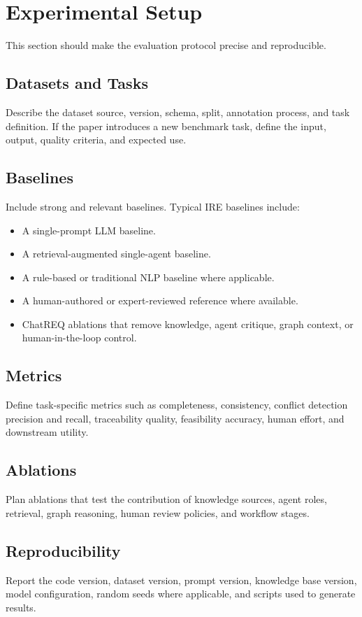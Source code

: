 \section{Experimental Setup}

This section should make the evaluation protocol precise and reproducible.

\subsection{Datasets and Tasks}

Describe the dataset source, version, schema, split, annotation process, and task definition. If the paper introduces a new benchmark task, define the input, output, quality criteria, and expected use.

\subsection{Baselines}

Include strong and relevant baselines. Typical IRE baselines include:

\begin{itemize}
  \item A single-prompt LLM baseline.
  \item A retrieval-augmented single-agent baseline.
  \item A rule-based or traditional NLP baseline where applicable.
  \item A human-authored or expert-reviewed reference where available.
  \item ChatREQ ablations that remove knowledge, agent critique, graph context, or human-in-the-loop control.
\end{itemize}

\subsection{Metrics}

Define task-specific metrics such as completeness, consistency, conflict detection precision and recall, traceability quality, feasibility accuracy, human effort, and downstream utility.

\subsection{Ablations}

Plan ablations that test the contribution of knowledge sources, agent roles, retrieval, graph reasoning, human review policies, and workflow stages.

\subsection{Reproducibility}

Report the code version, dataset version, prompt version, knowledge base version, model configuration, random seeds where applicable, and scripts used to generate results.

